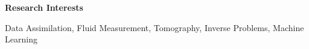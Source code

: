 \begin{center}
    \textbf{Research Interests}
\end{center}

Data Assimilation, Fluid Measurement, Tomography, Inverse Problems, Machine Learning
